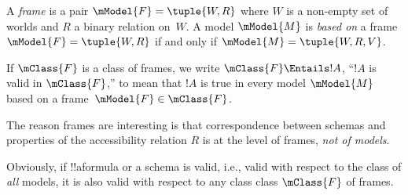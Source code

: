 \documentclass[../../../include/open-logic-section]{subfiles}
\begin{document}


\begin{defn}
  A \emph{frame} is a pair $\mModel{F} = \tuple{W,R}$ where $W$ is a
  non-empty set of worlds and $R$ a binary relation on~$W$. A model
  $\mModel{M}$ is \emph{based on} a frame $\mModel{F} = \tuple{W,R}$
  if and only if $\mModel{M} = \tuple{W, R, V}$.
\end{defn}

\begin{defn}
  If $\mClass{F}$ is a class of frames, we write $\mClass{F} \Entails
  !A$, ``$!A$ is valid in $\mClass{F}$,'' to mean that $!A$ is true in
  every model $\mModel{M}$ based on a frame~$\mModel{F} \in
  \mClass{F}$.
\end{defn}

The reason frames are interesting is that correspondence between
schemas and properties of the accessibility relation $R$ is at the
level of frames, \emph{not of models}.

\begin{rem}
  Obviously, if !!a{formula} or a schema is valid, i.e., valid with
  respect to the class of \emph{all} models, it is also valid with
  respect to any class class $\mClass{F}$ of frames.
\end{rem}
\end{document}
